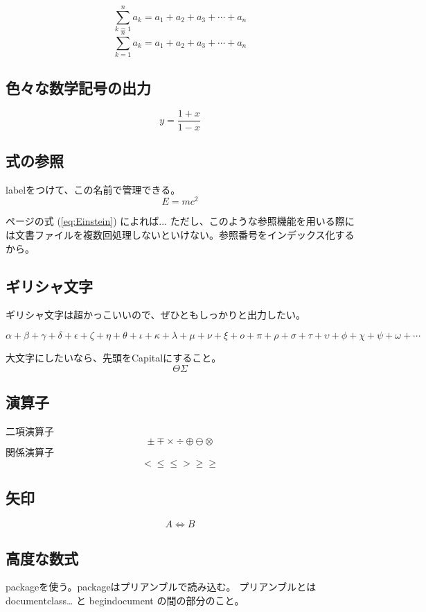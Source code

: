 \documentclass{article}
\begin{document}
\[
  \sum_{k=1}^n a_k = a_1 + a_2 + a_3 + \cdots + a_n
\]
\begin{equation}
  \sum_{k=1}^n a_k = a_1 + a_2 + a_3 + \cdots + a_n
\end{equation}

\subsection{色々な数学記号の出力}
\[ y=\frac{1+x}{1-x}\]

\subsection{式の参照}
labelをつけて、この名前で管理できる。
\begin{equation}
  E = mc^2 \label{eq:Einstein}
\end{equation}

\pageref{eq:Einstein} ページの式 (\ref{eq:Einstein}) によれば...
ただし、このような参照機能を用いる際には文書ファイルを複数回処理しないといけない。参照番号をインデックス化するから。

\subsection{ギリシャ文字}
ギリシャ文字は超かっこいいので、ぜひともしっかりと出力したい。

\[
\alpha +
\beta +
\gamma +
\delta +
\epsilon +
\zeta +
\eta +
\theta +
\iota +
\kappa +
\lambda +
\mu +
\nu +
\xi +
o +
\pi +
\rho +
\sigma +
\tau +
\upsilon +
\phi +
\chi +
\psi +
\omega + \dotsb
\]

大文字にしたいなら、先頭をCapitalにすること。
\[
\Theta
\Sigma
\]

\subsection{演算子}
二項演算子
\[
\pm
\mp
\times
\div
\oplus
\ominus
\otimes
\]
関係演算子
\[
  < \le \leq > \ge \geq
\]

\subsection{矢印}
\[
A \Leftrightarrow B
\]

\subsection{高度な数式}
packageを使う。packageはプリアンブルで読み込む。
プリアンブルとは documentclass{…} と begin{document} の間の部分のこと。
\end{document}
